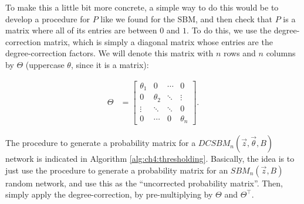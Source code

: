 To make this a little bit more concrete, a simple way to do this would be to develop a procedure for $P$ like we found for the SBM, and then check that $P$ is a matrix where all of its entries are between $0$ and $1$. To do this, we use the degree-correction matrix, which is simply a diagonal matrix whose entries are the degree-correction factors. We will denote this matrix with $n$ rows and $n$ columns by $\Theta$ (uppercase $\theta$, since it is a matrix):

\begin{align}
    \Theta &= \begin{bmatrix}
        \theta_1 & 0 & \cdots & 0 \\
        0 & \theta_2 & \ddots & \vdots \\
        \vdots & \ddots & \ddots & 0 \\
        0 & \cdots & 0 & \theta_n
    \end{bmatrix}.
    \label{eqn:ch5:dcsbm:Theta}
\end{align}

The procedure to generate a probability matrix for a $DCSBM_n(\vec z, \vec\theta, B)$ network is indicated in Algorithm \ref{alg:ch4:thresholding}. Basically, the idea is to just use the procedure to generate a probability matrix for an $SBM_n(\vec z, B)$ random network, and use this as the ``uncorrected probability matrix''. Then, simply apply the degree-correction, by pre-multiplying by $\Theta$ and $\Theta^\top$. 

